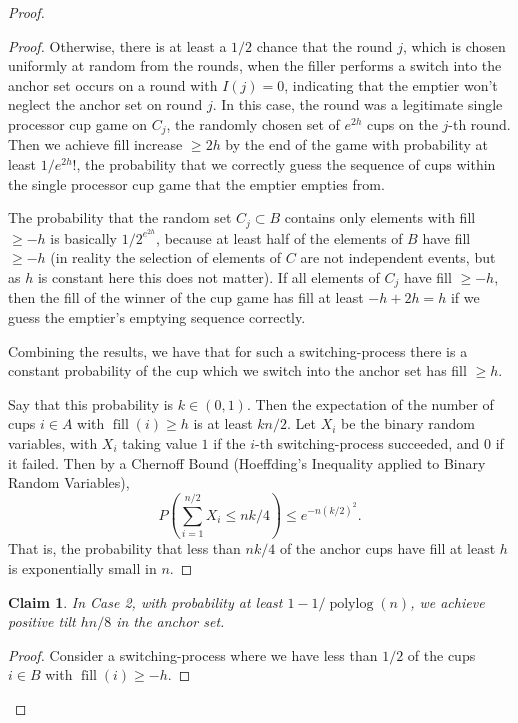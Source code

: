 \documentclass[twocolumn]{article}[11pt]
\DeclareMathOperator{\polylog}{\text{polylog}}
\DeclareMathOperator{\fil}{\text{fill}}
\newtheorem{clm}{Claim}
\begin{document}
\begin{proof}
\begin{proof}
  Otherwise, there is at least a $1/2$ chance that the round $j$, which is
  chosen uniformly at random from the rounds, when the filler performs a switch
  into the anchor set occurs on a round with $I(j)=0$, indicating that the emptier
  won't neglect the anchor set on round $j$. In this case, the round was a
  legitimate single processor cup game on $C_j$, the randomly chosen set of
  $e^{2h}$ cups on the $j$-th round. Then we achieve fill increase $\ge 2h$ by the
  end of the game with probability at least $1/e^{2h}!$, the probability that we
  correctly guess the sequence of cups within the single processor cup game
  that the emptier empties from. 

  The probability that the random set $C_j \subset B$ contains only elements
  with fill $\ge -h$ is basically $1/2^{e^{2h}}$, because at least half of the
  elements of $B$ have fill $\ge -h$ ({\color{red}in reality the selection of
    elements of $C$ are not independent events, but as $h$ is constant here this
  does not matter}). If all elements of $C_j$ have fill $\ge -h$, then the fill
  of the winner of the cup game has fill at least $-h + 2h = h$ if we guess the
  emptier's emptying sequence correctly.

  Combining the results, we have that for such a switching-process there is a
  constant probability of the cup which we switch into the anchor set has fill
  $\ge h$. 

  Say that this probability is $k \in (0,1)$. Then the expectation of the
  number of cups $i \in A$ with $\fil(i) \ge h$ is at least $kn/2$. Let $X_i$
  be the binary random variables, with $X_i$ taking value $1$ if the $i$-th
  switching-process succeeded, and $0$ if it failed. Then by a Chernoff Bound
  (Hoeffding's Inequality applied to Binary Random Variables),
  $$P\left(\sum_{i=1}^{n/2} X_i\le nk/4\right) \le e^{-n(k/2)^2}.$$ 
  That is, the probability that less than $nk/4$ of the anchor cups have fill
  at least $h$ is exponentially small in $n$.

\end{proof}

\begin{clm}
  \label{clm:xtreme}
  In Case 2, with probability at least $1- 1/\polylog(n)$, we achieve positive tilt $hn/8$ in the anchor set.
\end{clm}

\begin{proof}
  Consider a switching-process where we have less than $1/2$ of the cups $i\in B$
  with $\fil(i) \ge -h$.


\end{proof}
\end{proof}
\end{document}
